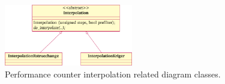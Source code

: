 \begin{figure}
  \centering
  \includegraphics[width=0.50\textwidth]{figures/user-guide/tool-design-interpolate-interpolation.pdf}
  \caption{Performance counter interpolation related diagram classes.}
  \label{fig:tool_design_interpolate_interpolation}
\end{figure}
